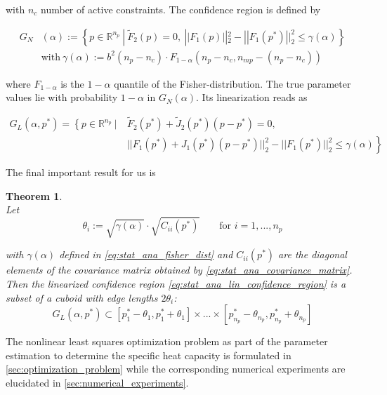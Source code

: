 \documentclass{scrartcl}[12pt, halfparskip]
\numberwithin{equation}{section}
\numberwithin{figure}{section}
\numberwithin{table}{section}
\newtheorem{Theorem}{Theorem}
\begin{document}
with $n_c$ number of active constraints. 
The confidence region is defined by

\begin{align}
	G_N&(\alpha)  := \left\{ p \in \mathbb{R}^{n_p} \ | \ \tilde{F}_2(p) = 0, \ || F_1(p) ||_2^2 - || F_1(p^*) ||_2^2 \le \gamma(\alpha) \right\} \\
	& \text{with} \ \gamma(\alpha) := b^2 (n_p - n_c) \cdot F_{1-\alpha}(n_p - n_c, n_{mp} - (n_p - n_c)) \label{eq:stat_ana_fisher_dist}
\end{align} 

where $F_{1-\alpha}$ is the $1-\alpha$ quantile of the Fisher-distribution. The true parameter values lie with probability $1-\alpha$ in $G_N(\alpha)$. Its linearization reads as

\begin{align}
	G_L(\alpha, p^*) = \left\{ p \in \mathbb{R}^{n_p} \ | \ \right. & \tilde{F}_2(p^*) + \tilde{J}_2(p^*)(p - p^*) = 0, \label{eq:stat_ana_lin_confidence_region} \\ 
	& \left. || F_1(p^*) + J_1(p^*)(p - p^*) ||_2^2 - || F_1(p^*)||_2^2 \le \gamma(\alpha) \right\} \nonumber	
\end{align}



The final important result for us is

\begin{Theorem} \mbox{}\\
	Let 
	\begin{equation}
		\theta_i := \sqrt{\gamma(\alpha)} \cdot \sqrt{C_{ii}(p^*)} \qquad \text{for } i=1,...,n_p
	\end{equation}
	
with $\gamma(\alpha)$ defined in \cref{eq:stat_ana_fisher_dist} and $C_{ii}(p^*)$ are the diagonal elements of the covariance matrix obtained by \cref{eq:stat_ana_covariance_matrix}. Then the linearized confidence region \cref{eq:stat_ana_lin_confidence_region} is a subset of a cuboid with edge lengths $2 \theta_i$:
	\begin{equation}
		G_L(\alpha, p^*) \subset [p_1^* - \theta_1, p_1^* + \theta_1] \times ... \times [p_{n_p}^* - \theta_{n_p}, p_{n_p}^* + \theta_{n_p}]
	\end{equation}
	
\end{Theorem}


\vspace{0.5cm}
The nonlinear least squares optimization problem as part of the parameter estimation to determine the specific heat capacity is formulated in \cref{sec:optimization_problem} while the corresponding numerical experiments are elucidated in \cref{sec:numerical_experiments}.
\end{document}
